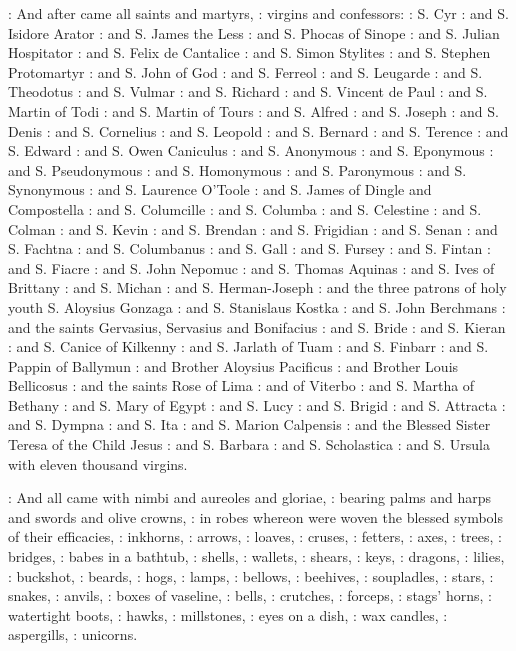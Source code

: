 :
And after came all saints and martyrs,
:
virgins and confessors:
:
S. Cyr
:
and S. Isidore Arator
:
and S. James the Less 
:
and S. Phocas of Sinope 
:
and S. Julian Hospitator 
:
and S. Felix de Cantalice 
:
and S. Simon Stylites 
:
and S. Stephen Protomartyr 
:
and S. John of God 
:
and S. Ferreol 
:
and S. Leugarde 
:
and S. Theodotus 
:
and S. Vulmar 
:
and S. Richard 
:
and S. Vincent de Paul 
:
and S. Martin of Todi 
:
and S. Martin of Tours 
:
and S. Alfred 
:
and S. Joseph 
:
and S. Denis 
:
and S. Cornelius 
:
and S. Leopold 
:
and S. Bernard 
:
and S. Terence 
:
and S. Edward 
:
and S. Owen Caniculus 
:
and S. Anonymous 
:
and S. Eponymous 
:
and S. Pseudonymous 
:
and S. Homonymous 
:
and S. Paronymous 
:
and S. Synonymous 
:
and S. Laurence O'Toole 
:
and S. James of Dingle and Compostella 
:
and S. Columcille 
:
and S. Columba 
:
and S. Celestine 
:
and S. Colman 
:
and S. Kevin 
:
and S. Brendan 
:
and S. Frigidian 
:
and S. Senan 
:
and S. Fachtna 
:
and S. Columbanus 
:
and S. Gall 
:
and S. Fursey 
:
and S. Fintan 
:
and S. Fiacre 
:
and S. John Nepomuc 
:
and S. Thomas Aquinas 
:
and S. Ives of Brittany 
:
and S. Michan 
:
and S. Herman-Joseph 
:
and the three patrons of holy youth S. Aloysius Gonzaga 
:
and S. Stanislaus Kostka 
:
and S. John Berchmans 
:
and the saints Gervasius, Servasius and Bonifacius 
:
and S. Bride 
:
and S. Kieran 
:
and S. Canice of Kilkenny 
:
and S. Jarlath of Tuam 
:
and S. Finbarr 
:
and S. Pappin of Ballymun 
:
and Brother Aloysius Pacificus 
:
and Brother Louis Bellicosus 
:
and the saints Rose of Lima 
:
and of Viterbo 
:
and S. Martha of Bethany 
:
and S. Mary of Egypt 
:
and S. Lucy 
:
and S. Brigid 
:
and S. Attracta 
:
and S. Dympna 
:
and S. Ita 
:
and S. Marion Calpensis 
:
and the Blessed Sister Teresa of the Child Jesus 
:
and S. Barbara 
:
and S. Scholastica 
:
and S. Ursula with eleven thousand virgins.

:
And all came with nimbi and aureoles and gloriae,
:
bearing palms and harps and swords and olive crowns,
:
in robes whereon were woven the blessed symbols of their efficacies,
:
inkhorns,
:
arrows,
:
loaves,
:
cruses,
:
fetters,
:
axes,
:
trees,
:
bridges,
:
babes in a bathtub,
:
shells,
:
wallets,
:
shears,
:
keys,
:
dragons,
:
lilies,
:
buckshot,
:
beards,
:
hogs,
:
lamps,
:
bellows,
:
beehives,
:
soupladles,
:
stars,
:
snakes,
:
anvils,
:
boxes of vaseline,
:
bells,
:
crutches,
:
forceps,
:
stags' horns,
:
watertight boots,
:
hawks,
:
millstones,
:
eyes on a dish,
:
wax candles,
:
aspergills,
:
unicorns.

